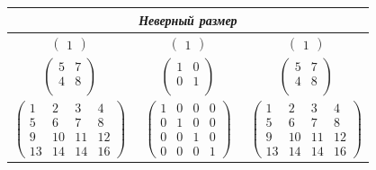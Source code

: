 \begin{table}[h!]
\begin{tabular}{||c|c|c||}
        &
        \textit{Неверный размер} \\
        \hline
        $\begin{pmatrix}
            1
        \end{pmatrix}$ 
        &  
        $\begin{pmatrix}
            1
        \end{pmatrix}$
        &
        $\begin{pmatrix}
            1
        \end{pmatrix}$ \\
        \hline
        $\begin{pmatrix}
            5 & 7\\
            4 & 8\\
        \end{pmatrix}$ 
        &  
        $\begin{pmatrix}
            1 & 0\\
            0 & 1\\
        \end{pmatrix}$
        &
        $\begin{pmatrix}
            5 & 7\\
            4 & 8\\
        \end{pmatrix}$ \\
        \hline
        $\begin{pmatrix}
            1 & 2 & 3 & 4\\
            5 & 6 & 7 & 8\\
            9 & 10 & 11 & 12\\
            13 & 14 & 14 & 16
        \end{pmatrix}$ 
        &  
        $\begin{pmatrix}
            1 & 0 & 0 & 0\\
            0 & 1 & 0 & 0\\
            0 & 0 & 1 & 0\\
            0 & 0 & 0 & 1
        \end{pmatrix}$
        &
        $\begin{pmatrix}
            1 & 2 & 3 & 4\\
            5 & 6 & 7 & 8\\
            9 & 10 & 11 & 12\\
            13 & 14 & 14 & 16
        \end{pmatrix}$ \\
        \hline
        \end{tabular}
\end{table}

